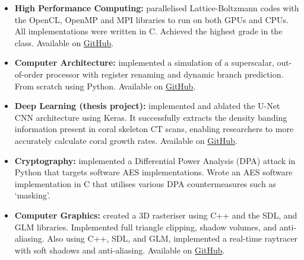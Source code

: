 \vspace{-1.1em}


\vspace{0.2em}

\begin{cvparagraph}

\begin{itemize}[leftmargin=*]
    \itemsep-0.6em
    \item {\textbf{High Performance Computing:} parallelised Lattice-Boltzmann codes with the OpenCL, OpenMP and MPI libraries to run on both GPUs and CPUs. All implementations were written in C. Achieved the highest grade in the class. Available on \href{https://github.com/ainsleyrutterford/HPC-OpenCL}{GitHub}.}
    \item {\textbf{Computer Architecture:} implemented a simulation of a superscalar, out-of-order processor with register renaming and dynamic branch prediction. From scratch using Python. Available on \href{https://github.com/ainsleyrutterford/Superscalar}{GitHub}.}
    \item{\textbf{Deep Learning (thesis project):} implemented and ablated the U-Net CNN architecture using Keras. It successfully extracts the density banding information present in coral skeleton CT scans, enabling researchers to more accurately calculate coral growth rates. Available on \href{https://github.com/ainsleyrutterford/Thesis}{GitHub}.}
    \item {\textbf{Cryptography:} implemented a Differential Power Analysis (DPA) attack in Python that targets software AES implementations. Wrote an AES software implementation in C that utilises various DPA countermeasures such as ‘masking’.}
    \item {\textbf{Computer Graphics:} created a 3D rasteriser using C++ and the SDL, and GLM libraries. Implemented full triangle clipping, shadow volumes, and anti-aliasing. Also using C++, SDL, and GLM, implemented a real-time raytracer with soft shadows and anti-aliasing. Available on \href{https://github.com/ainsleyrutterford/Rasteriser}{GitHub}.}
\end{itemize}

\end{cvparagraph}
